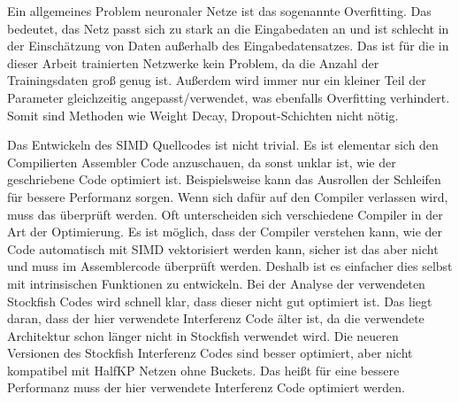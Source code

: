 
Ein allgemeines Problem neuronaler Netze ist das sogenannte Overfitting. Das bedeutet, das Netz passt sich zu stark an die Eingabedaten an und ist schlecht in der Einschätzung von Daten außerhalb des Eingabedatensatzes. Das ist für die in dieser Arbeit trainierten Netzwerke kein Problem, da die Anzahl der Trainingsdaten groß genug ist. Außerdem wird immer nur ein kleiner Teil der Parameter gleichzeitig angepasst/verwendet, was ebenfalls Overfitting verhindert. Somit sind Methoden wie \zb{} Weight Decay, Dropout-Schichten nicht nötig.

Das Entwickeln des \ac{SIMD} Quellcodes ist nicht trivial. Es ist elementar sich den Compilierten Assembler Code anzuschauen, da sonst unklar ist, wie der geschriebene Code optimiert ist. Beispielsweise kann das Ausrollen der Schleifen für bessere Performanz sorgen. Wenn sich dafür auf den Compiler verlassen wird, muss das überprüft werden. Oft unterscheiden sich verschiedene Compiler in der Art der Optimierung. Es ist möglich, dass der Compiler verstehen kann, wie der Code automatisch mit \ac{SIMD} vektorisiert werden kann, sicher ist das aber nicht und muss im Assemblercode überprüft werden. Deshalb ist es einfacher dies selbst mit intrinsischen Funktionen zu entwickeln. Bei der Analyse der verwendeten Stockfish Codes wird schnell klar, dass dieser nicht gut optimiert ist. Das liegt daran, dass der hier verwendete Interferenz Code älter ist, da die verwendete Architektur schon länger nicht in Stockfish verwendet wird. Die neueren Versionen des Stockfish Interferenz Codes sind besser optimiert, aber nicht kompatibel mit HalfKP Netzen ohne Buckets. Das heißt für eine bessere Performanz muss der hier verwendete Interferenz Code optimiert werden.